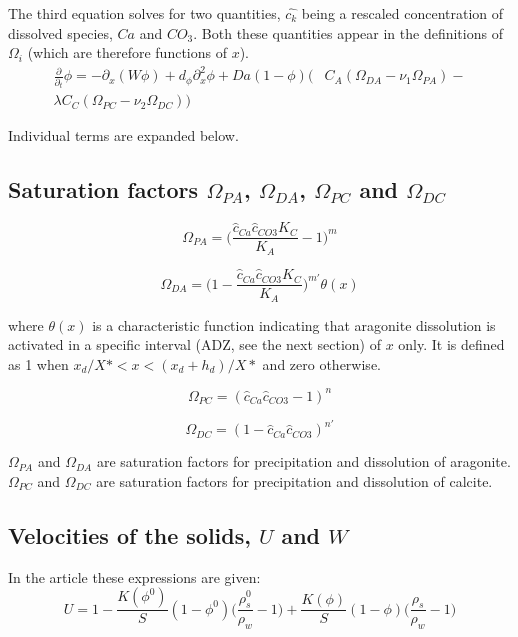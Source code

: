 \documentclass[11pt, letterpaper]{article}
\begin{document}
The third equation solves for two quantities, $\hat{c_k}$ being a rescaled concentration of dissolved species, $Ca$ and $CO_3$. Both these quantities appear in the definitions of $\Omega_i$ (which are therefore functions of $x$).
\begin{equation}
\begin{split}
\frac{\partial}{\partial_t} \phi = - \partial_x(W\phi) + d_{\phi} \partial^2_x \phi + Da(1 - \phi) \big(&C_A(\Omega_{DA} - \nu_1\Omega_{PA}) - \\\lambda C_C(\Omega_{PC} - \nu_2\Omega_{DC})\big)
\end{split}
\end{equation}

Individual terms are expanded below.

\subsection{Saturation factors $\Omega_{PA}$, $\Omega_{DA}$, $\Omega_{PC}$ and $\Omega_{DC}$}

\begin{equation}
\Omega_{PA} = \big(\frac{\hat{c}_{Ca} \hat{c}_{CO3} K_C}{K_A} - 1 \big) ^m
\end{equation}

\begin{equation}
\Omega_{DA} = \big(1 - \frac{\hat{c}_{Ca} \hat{c}_{CO3} K_C}{K_A} \big) ^{m'} \theta(x)
\end{equation}

where $\theta(x)$ is a characteristic function indicating that aragonite dissolution is activated in a specific interval (ADZ, see the next section) of $x$ only. It is defined as 1 when $x_d/X* < x < (x_d + h_d)/X*$ and zero otherwise.

\begin{equation}
\Omega_{PC} = (\hat{c}_{Ca} \hat{c}_{CO3}  - 1 ) ^n
\end{equation}

\begin{equation}
\Omega_{DC} = (1 - \hat{c}_{Ca} \hat{c}_{CO3} ) ^{n'}
\end{equation}

$\Omega_{PA}$ and $\Omega_{DA}$ are saturation factors for precipitation and dissolution of aragonite. $\Omega_{PC}$ and $\Omega_{DC}$ are saturation factors for precipitation and dissolution of calcite.

\subsection{Velocities of the solids, $U$ and $W$}
In the article these expressions are given:
\begin{equation}
    U = 1 - \frac{K(\phi^0)}{S}(1-\phi^0)\big(\frac{\rho_s^0}{\rho_w} - 1 \big) + \frac{K(\phi)}{S}(1-\phi) \big(\frac{\rho_s}{\rho_w}-1\big)
\end{equation}
\end{document}
